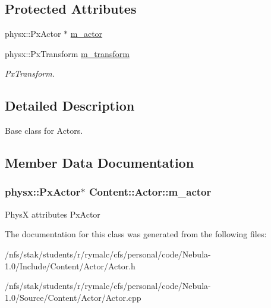 \subsection*{Protected Attributes}
\begin{Indent}{\bf }\par
{\em \label{_amgrpd41d8cd98f00b204e9800998ecf8427e}
 }\begin{DoxyCompactItemize}
\item 
physx::PxActor $\ast$ \hyperlink{classContent_1_1Actor_a228d76695160303b4f02ca60f19a5d35}{m\_\-actor}
\item 
\hypertarget{classContent_1_1Actor_a053d90de682f161d7eaf575bdef38e10}{
physx::PxTransform \hyperlink{classContent_1_1Actor_a053d90de682f161d7eaf575bdef38e10}{m\_\-transform}}
\label{classContent_1_1Actor_a053d90de682f161d7eaf575bdef38e10}

\begin{DoxyCompactList}\small\item\em PxTransform. \item\end{DoxyCompactList}\end{DoxyCompactItemize}
\end{Indent}


\subsection{Detailed Description}
Base class for Actors. 

\subsection{Member Data Documentation}
\hypertarget{classContent_1_1Actor_a228d76695160303b4f02ca60f19a5d35}{
\subsubsection[{m\_\-actor}]{\setlength{\rightskip}{0pt plus 5cm}physx::PxActor$\ast$ {\bf Content::Actor::m\_\-actor}}}
\label{classContent_1_1Actor_a228d76695160303b4f02ca60f19a5d35}
PhysX attributes PxActor 

The documentation for this class was generated from the following files:\begin{DoxyCompactItemize}
\item 
/nfs/stak/students/r/rymalc/cfs/personal/code/Nebula-\/1.0/Include/Content/Actor/Actor.h\item 
/nfs/stak/students/r/rymalc/cfs/personal/code/Nebula-\/1.0/Source/Content/Actor/Actor.cpp\end{DoxyCompactItemize}
